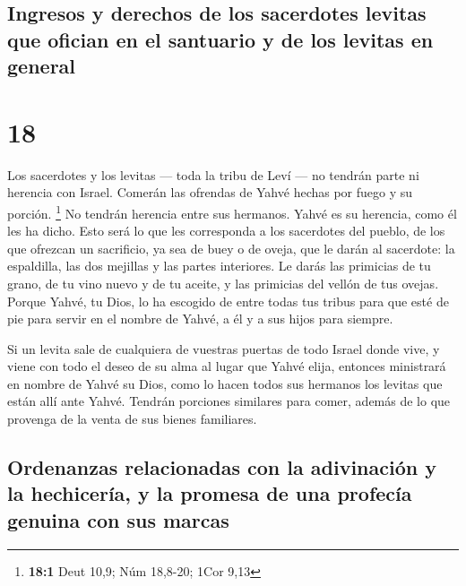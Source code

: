 \hypertarget{ingresos-y-derechos-de-los-sacerdotes-levitas-que-ofician-en-el-santuario-y-de-los-levitas-en-general}{%
\subsection{Ingresos y derechos de los sacerdotes levitas que ofician en
el santuario y de los levitas en
general}\label{ingresos-y-derechos-de-los-sacerdotes-levitas-que-ofician-en-el-santuario-y-de-los-levitas-en-general}}

\hypertarget{section-17}{%
\section{18}\label{section-17}}

 Los sacerdotes y los levitas --- toda la tribu de Leví
--- no tendrán parte ni herencia con Israel. Comerán las ofrendas de
Yahvé hechas por fuego y su porción. \footnote{\textbf{18:1} Deut 10,9;
  Núm 18,8-20; 1Cor 9,13}  No tendrán herencia entre sus
hermanos. Yahvé es su herencia, como él les ha dicho. 
Esto será lo que les corresponda a los sacerdotes del pueblo, de los que
ofrezcan un sacrificio, ya sea de buey o de oveja, que le darán al
sacerdote: la espaldilla, las dos mejillas y las partes interiores.
 Le darás las primicias de tu grano, de tu vino nuevo y de
tu aceite, y las primicias del vellón de tus ovejas. 
Porque Yahvé, tu Dios, lo ha escogido de entre todas tus tribus para que
esté de pie para servir en el nombre de Yahvé, a él y a sus hijos para
siempre.

 Si un levita sale de cualquiera de vuestras puertas de
todo Israel donde vive, y viene con todo el deseo de su alma al lugar
que Yahvé elija,  entonces ministrará en nombre de Yahvé
su Dios, como lo hacen todos sus hermanos los levitas que están allí
ante Yahvé.  Tendrán porciones similares para comer,
además de lo que provenga de la venta de sus bienes familiares.

\hypertarget{ordenanzas-relacionadas-con-la-adivinaciuxf3n-y-la-hechiceruxeda-y-la-promesa-de-una-profecuxeda-genuina-con-sus-marcas}{%
\subsection{Ordenanzas relacionadas con la adivinación y la hechicería,
y la promesa de una profecía genuina con sus
marcas}\label{ordenanzas-relacionadas-con-la-adivinaciuxf3n-y-la-hechiceruxeda-y-la-promesa-de-una-profecuxeda-genuina-con-sus-marcas}}

